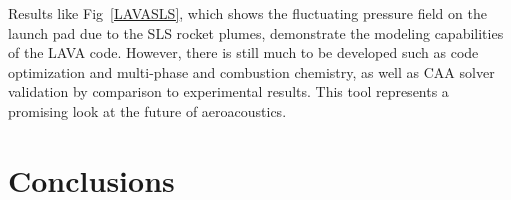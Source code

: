 \documentclass[]{aiaa-tc}%
\begin{document}
Results like Fig~\ref{LAVASLS}, which shows the fluctuating pressure field on the launch pad due to the SLS rocket plumes, demonstrate the modeling capabilities of the LAVA code.  However, there is still much to be developed such as code optimization and multi-phase and combustion chemistry, as well as CAA solver validation by comparison to experimental results.  This tool represents a promising look at the future of aeroacoustics.

\section{Conclusions}
\end{document}
